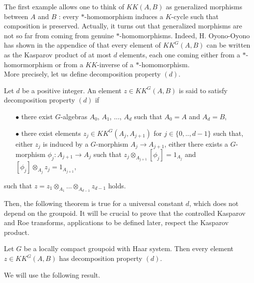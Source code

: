 The first example allows one to think of $KK(A,B)$ as generalized morphisms between $A$ and $B$ : every $*$-homomorphism induces a $K$-cycle such that composition is preserved. Actually, it turns out that generalized morphisms are not so far from coming from genuine $*$-homomorphisms. Indeed, H. Oyono-Oyono has shown in the appendice of \cite{LaffOY} that every element of $KK^G(A,B)$ can be written as the Kasparov product of at most $d$ elements, each one coming either from a $*$-homormorphism or from a $KK$-inverse of a $*$-homomorphism.\\

More precisely, let us define decomposition property $(d)$.

\begin{definition}
Let $d$ be a positive integer. An element $z\in KK^G(A,B)$ is said to satisfy decomposition property $(d)$ if
\begin{itemize}
\item[$\bullet$] there exist $G$-algebras $A_0$, $A_1$, ..., $A_d$ such that $A_0=A$ and $A_d=B$, 
\item[$\bullet$] there exist elements $z_j \in KK^G(A_{j},A_{j+1})$ for $j\in\{0,..,d-1\}$ such that, either $z_j$ is induced by a $G$-morphism $A_j \rightarrow A_{j+1}$, either there exists a $G$-morphism $\phi_j : A_{j+1}\rightarrow A_j$ such that $z_j \otimes_{A_{j+1}} [\phi_j] = 1_{A_j}$ and $ [\phi_j] \otimes_{A_{j}} z_j  = 1_{A_{j+1}}$,
\end{itemize}
such that $z = z_1 \otimes_{A_1}  ... \otimes_{A_{d-1}} z_{d-1} $ holds.
\end{definition}

Then, the following theorem is true for a universal constant $d$, which does not depend on the groupoid. It will be crucial to prove that the controlled Kasparov and Roe transforms, applications to be defined later, respect the Kasparov product. 

\begin{thm}\label{propertyD}
Let $G$ be a locally compact groupoid with Haar system. Then every element $z\in KK^G(A,B)$ has decomposition property $(d)$.
\end{thm}
 
We will use the following result.\cite{blackadar}\cite{CuSk}


